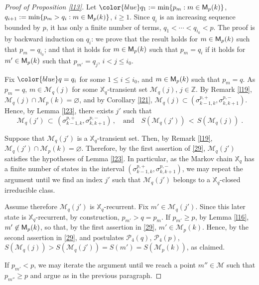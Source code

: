 \documentclass[reqno]{amsart}
\theoremstyle{plain}
\theoremstyle{definition}
\newcommand{\mc}[1]{{\mathcal #1}}
\newcommand{\bb}[1]{{\mathbb #1}}
\newcommand{\ms}[1]{{\mathscr #1}}
\newcommand{\mss}[1]{{\textsf #1}}
\newcounter{as}[section]
\newcommand{\<}{\langle}
\renewcommand{\>}{\rangle}
\begin{document}
\begin{proof}[Proof of Proposition \ref{l13}]
Let ${\color{blue} q_1} := \min \{p_m : m\in \mss M_p(k)\}$,
$q_{i+1} := \min \{p_m > q_i : m\in \mss M_p(k)\}$, $i\ge 1$. Since
$q_i$ is an increasing sequence bounded by $p$, it has only a finite
number of terms, $q_1 < \cdots < q_{i_0} <p$. The proof is by backward
induction on $q_i$: we prove that the result holds for
$m\in \mss M_p(k)$ such that $p_m=q_{i_0}$; and that it holds for
$m\in \mss M_p(k)$ such that $p_m=q_i$ if it holds for
$m'\in \mss M_p(k)$ such that $p_{m'}=q_j$, $i<j\le i_0$.

Fix $\color{blue} q=q_i$ for some $1\le i\le i_0$, and
$m\in \mss M_p(k)$ such that $p_m=q$.  As $p_m=q$, $m\in \ms M_{q}(j)$
for some $\bb X_q$-transient set $\ms M_{q}(j)$, $j\in \bb Z$. By
Remark \ref{l19}, $\ms M_{q}(j) \cap \ms M_{p}(k) = \varnothing$, and
by Corollary \ref{l21},
$\ms M_{q}(j) \subset (\sigma^{p,+}_{k-1,k}, \sigma^{p,-}_{k,k+1})$.
Hence, by Lemma \ref{l23}, there exists $j'$ such that
\begin{equation}
\label{29}
\ms M_{q}(j') \,\subset\,
(\sigma^{p,+}_{k-1,k}, \sigma^{p,-}_{k,k+1})\,,
\quad\text{and}\quad
S(\ms M_{q}(j')) \,<\,
S(\ms M_{q}(j))\;.
\end{equation}

Suppose that $\ms M_{q}(j')$ is a $\bb X_q$-transient set. Then, by
Remark \ref{l19}, $\ms M_{q}(j') \cap \ms M_{p}(k) =
\varnothing$. Therefore, by the first assertion of \eqref{29},
$\ms M_{q}(j')$ satisfies the hypotheses of Lemma \ref{l23}.  In
particular, as the Markov chain $\bb X_q$ has a finite number of
states in the interval $(\sigma^{p,+}_{k-1,k}, \sigma^{p,-}_{k,k+1})$,
we may repeat the argument until we find an index $j'$ such that
$\ms M_{q}(j')$ belongs to a $\bb X_q$-closed irreducible class.

Assume therefore $\ms M_{q}(j')$ is $\bb X_q$-recurrent.  Fix
$m'\in \ms M_{q}(j')$. Since this later state is $\bb
X_q$-recurrent, by construction, $p_{m'}> q = p_m$. If $p_{m'} \ge p$,
by Lemma \ref{l16}, $m'\not\in \mss M_p(k)$, so that, by the first
assertion in \eqref{29}, $m'\in \ms M_{p}(k)$. Hence, by the second
assertion in \eqref{29}, and postulates $\mc P_4(q)$, $\mc P_4(p)$,
$S(\ms M_{q}(j)) > S(\ms M_{q}(j')) = S(m')=S(\ms M_{p}(k))$, as
claimed.

If $p_{m'}<p$, we may iterate the argument until we reach a point
$m''\in \mc M$ such that $p_{m''} \ge p$ and argue as in the previous
paragraph. 
\end{proof}
\end{document}
